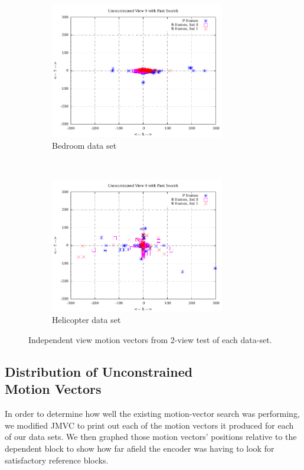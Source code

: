 \documentclass{sig-alternate-05-2015}
\begin{document}
\begin{figure}[H]
\centering
\begin{subfigure}{.5\textwidth}
\centering
\includegraphics[width=3in]{figures/bedroom1-inter-mvs.pdf}
\caption{Bedroom data set}
\label{fig:bedroom-inter-mvs}
\end{subfigure} \\
\begin{subfigure}{.5\textwidth}
\centering
\includegraphics[width=3in]{figures/helicopter-inter-mvs.pdf}
\caption{Helicopter data set}
\label{fig:helicopter-inter-mvs}
\end{subfigure}
\caption{Independent view motion vectors from 2-view test of each data-set.}
\label{fig:inter-mvs}
\end{figure}

\subsection{Distribution of Unconstrained \\ Motion Vectors}
\label{subsec:unconstrained}
In order to determine how well the existing motion-vector search was performing,
we modified JMVC to print out each of the motion vectors it produced for each of
our data sets. We then graphed those motion vectors' positions relative to the
dependent block to show how far afield the encoder was having to look for
satisfactory reference blocks.
\end{document}
